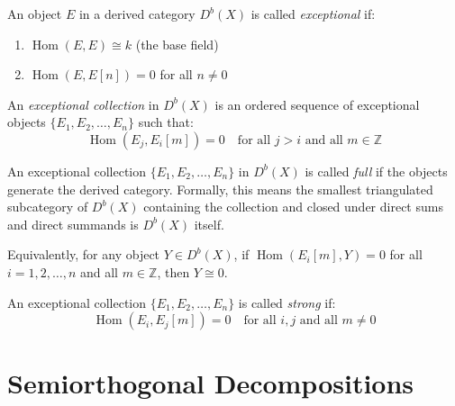 \documentclass[12pt]{article}
\begin{document}
\begin{definition}
    An object $E$ in a derived category $D^b(X)$ is called \textit{exceptional} if:
    \begin{enumerate}
        \item $\operatorname{Hom}(E, E) \cong k$ (the base field)
        \item $\operatorname{Hom}(E, E[n]) = 0$ for all $n \neq 0$
    \end{enumerate}
\end{definition}

\begin{definition}
    An \textit{exceptional collection} in $D^b(X)$ is an ordered sequence of exceptional objects $\{E_1, E_2, \ldots, E_n\}$ such that:
    \[
        \operatorname{Hom}(E_j, E_i[m]) = 0 \quad \text{for all } j > i \text{ and all } m \in \mathbb{Z}
    \]
\end{definition}

\begin{definition}
    An exceptional collection $\{E_1, E_2, \ldots, E_n\}$ in $D^b(X)$ is called \textit{full} if the objects generate the derived category. Formally, this means the smallest triangulated subcategory of $D^b(X)$ containing the collection and closed under direct sums and direct summands is $D^b(X)$ itself.

    Equivalently, for any object $Y \in D^b(X)$, if $\operatorname{Hom}(E_i[m], Y) = 0$ for all $i=1,2,\ldots,n$ and all $m \in \mathbb{Z}$, then $Y \cong 0$.
\end{definition}

\begin{definition}
    An exceptional collection $\{E_1, E_2, \ldots, E_n\}$ is called \textit{strong} if:
    \[
        \operatorname{Hom}(E_i, E_j[m]) = 0 \quad \text{for all } i, j \text{ and all } m \neq 0
    \]
\end{definition}

\section{Semiorthogonal Decompositions}
\end{document}
